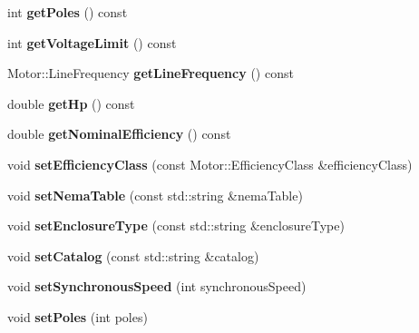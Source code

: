 \begin{DoxyCompactItemize}
\item 
\mbox{\label{class_motor_data_a478432c15ca29fd1e66b86f9d223248f}} 
int {\bfseries get\+Poles} () const
\item 
\mbox{\label{class_motor_data_a8c9be0561a4e5d18cb1504cc36f5f4ef}} 
int {\bfseries get\+Voltage\+Limit} () const
\item 
\mbox{\label{class_motor_data_a59db7b008daf788c7a6a186dcd49a46f}} 
Motor\+::\+Line\+Frequency {\bfseries get\+Line\+Frequency} () const
\item 
\mbox{\label{class_motor_data_a1a5e37e438f506d11326e70b6fb261b8}} 
double {\bfseries get\+Hp} () const
\item 
\mbox{\label{class_motor_data_a79aed11954e7f104446c43ad29178fa7}} 
double {\bfseries get\+Nominal\+Efficiency} () const
\item 
\mbox{\label{class_motor_data_aeb37e8295eeee82f0c5f9cd04043d7b7}} 
void {\bfseries set\+Efficiency\+Class} (const Motor\+::\+Efficiency\+Class \&efficiency\+Class)
\item 
\mbox{\label{class_motor_data_a51e4f837a2b97baf1aff49efb21ab7ff}} 
void {\bfseries set\+Nema\+Table} (const std\+::string \&nema\+Table)
\item 
\mbox{\label{class_motor_data_a7a6a1b8600a9c7481b32bf962edcef99}} 
void {\bfseries set\+Enclosure\+Type} (const std\+::string \&enclosure\+Type)
\item 
\mbox{\label{class_motor_data_ac7e264252a15a63a2fd35cbb114478e6}} 
void {\bfseries set\+Catalog} (const std\+::string \&catalog)
\item 
\mbox{\label{class_motor_data_ade2574702a50e2be835c5204ead50479}} 
void {\bfseries set\+Synchronous\+Speed} (int synchronous\+Speed)
\item 
\mbox{\label{class_motor_data_a62f02ca68370ee2a7182671eb035dbe2}} 
void {\bfseries set\+Poles} (int poles)

\end{DoxyCompactItemize}
